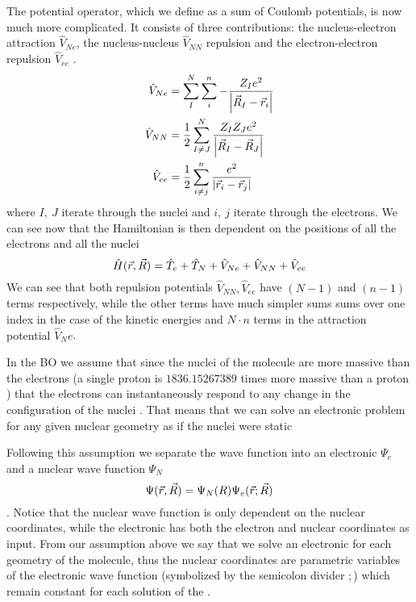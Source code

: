 \documentclass[../master_thesis.tex]{subfiles}
\begin{document}
The potential operator, which we define as a sum of Coulomb potentials, is now much more
complicated. It consists of three contributions: the nucleus-electron attraction
$\hat{V}_{Ne}$, the nucleus-nucleus $\hat{V}_{NN}$ repulsion and the electron-electron
repulsion $\hat{V}_{ee}$ \cite{Cramer:2004}.
\begin{align}
  \hat{V}_{Ne} &= \sum^N_I\sum^n_{i}-\frac{Z_Ie^2}{\abs{\vec{R}_I - \vec{r}_i}}\\
  \hat{V}_{NN} &= \frac{1}{2}\sum^N_{I \neq J}\frac{Z_IZ_Je^2}{\abs{\vec{R}_I - \vec{R}_J}}\\
  \hat{V}_{ee} &= \frac{1}{2}\sum^n_{i \neq j} \frac{e^2}{\abs{\vec{r}_i - \vec{r}_j}}
\end{align}
where $I,\ J$ iterate through the nuclei and $i, \ j$ iterate through the electrons.
We can see now that the Hamiltonian is then dependent on the positions of all the electrons and all
the nuclei \cite{Jensen:2017}
\begin{equation}
  \hat{H}(\vec{r}, \vec{R}) = \hat{T}_e + \hat{T}_N + \hat{V}_{Ne} +\hat{V}_{NN} + \hat{V}_{ee}
\end{equation}
We can see that both repulsion potentials $\hat{V}_{NN}, \hat{V}_{ee}$ have $(N - 1)$ and $(n - 1)$ terms
 respectively, while the other terms have much simpler sums {sums over one index in the case of the
kinetic energies and $N\cdot n$ terms in the attraction potential $\hat{V}_Ne$}.

In the \ac{BO}  we assume that since the nuclei of the molecule are more massive
than the electrons (a single proton is $1836.152 673 89$ times more massive
than a proton \cite{NIST:2019}) that the electrons can instantaneously respond to
any change in the configuration of the nuclei \cite{Atkins:2011}. That means that we can solve an
electronic problem for any given nuclear geometry as if the nuclei were static
\cite{Cramer:2004, Jensen:2017, Atkins:2014}

Following this  assumption we separate the wave function into an electronic
$\Psi_e$ and a nuclear wave function $\Psi_N$
\begin{equation}
  \Psi(\vec{r}, \vec{R}) = \Psi_N(R)\Psi_e(\vec{r}; \vec{R})
\end{equation}.
Notice that the nuclear wave function is only dependent on the nuclear coordinates,
while the electronic has both the electron and nuclear coordinates as input. From
our assumption above we say that we solve an electronic \SE for each geometry
of the molecule, thus the nuclear coordinates  are parametric variables of
the electronic wave function (symbolized by the semicolon divider $;$) which remain
constant for each solution of the \SE.
\end{document}
